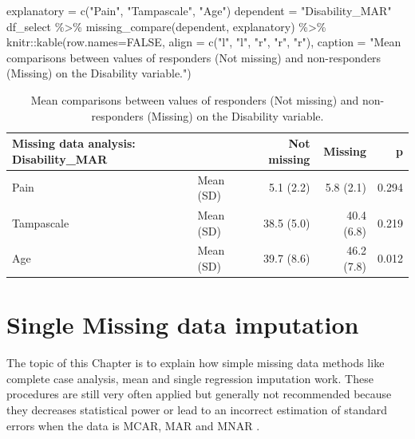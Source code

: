 \documentclass[
]{book}
\newenvironment{Shaded}{\begin{snugshade}}{\end{snugshade}}
\newcommand{\AttributeTok}[1]{\textcolor[rgb]{0.77,0.63,0.00}{#1}}
\newcommand{\ConstantTok}[1]{\textcolor[rgb]{0.00,0.00,0.00}{#1}}
\newcommand{\FunctionTok}[1]{\textcolor[rgb]{0.00,0.00,0.00}{#1}}
\newcommand{\NormalTok}[1]{#1}
\newcommand{\OtherTok}[1]{\textcolor[rgb]{0.56,0.35,0.01}{#1}}
\newcommand{\SpecialCharTok}[1]{\textcolor[rgb]{0.00,0.00,0.00}{#1}}
\newcommand{\StringTok}[1]{\textcolor[rgb]{0.31,0.60,0.02}{#1}}
\begin{document}
\begin{Shaded}
\begin{Highlighting}[]
\NormalTok{explanatory }\OtherTok{=} \FunctionTok{c}\NormalTok{(}\StringTok{"Pain"}\NormalTok{, }\StringTok{"Tampascale"}\NormalTok{, }\StringTok{"Age"}\NormalTok{)}
\NormalTok{dependent }\OtherTok{=} \StringTok{"Disability\_MAR"}
\NormalTok{df\_select }\SpecialCharTok{\%\textgreater{}\%} 
  \FunctionTok{missing\_compare}\NormalTok{(dependent, explanatory) }\SpecialCharTok{\%\textgreater{}\%} 
\NormalTok{    knitr}\SpecialCharTok{::}\FunctionTok{kable}\NormalTok{(}\AttributeTok{row.names=}\ConstantTok{FALSE}\NormalTok{, }\AttributeTok{align =} \FunctionTok{c}\NormalTok{(}\StringTok{"l"}\NormalTok{, }\StringTok{"l"}\NormalTok{, }\StringTok{"r"}\NormalTok{, }\StringTok{"r"}\NormalTok{, }\StringTok{"r"}\NormalTok{), }
        \AttributeTok{caption =} \StringTok{"Mean comparisons between values of responders (Not missing) and }
\StringTok{        non{-}responders (Missing) on the Disability variable."}\NormalTok{)}
\end{Highlighting}
\end{Shaded}

\begin{table}

\caption{\label{tab:unnamed-chunk-53}Mean comparisons between values of responders (Not missing) and 
        non-responders (Missing) on the Disability variable.}
\centering
\begin{tabular}[t]{l|l|r|r|r}
\hline
Missing data analysis: Disability\_MAR &   & Not missing & Missing & p\\
\hline
Pain & Mean (SD) & 5.1 (2.2) & 5.8 (2.1) & 0.294\\
\hline
Tampascale & Mean (SD) & 38.5 (5.0) & 40.4 (6.8) & 0.219\\
\hline
Age & Mean (SD) & 39.7 (8.6) & 46.2 (7.8) & 0.012\\
\hline
\end{tabular}
\end{table}

\hypertarget{single-missing-data-imputation}{%
\chapter{Single Missing data imputation}\label{single-missing-data-imputation}}

The topic of this Chapter is to explain how simple missing data methods like complete case analysis, mean and single regression imputation work. These procedures are still very often applied \citep{Eekhout2012} but generally not recommended because they decreases statistical power or lead to an incorrect estimation of standard errors when the data is MCAR, MAR and MNAR \citep{Eekhout2014, VanBuuren2018, enders2010applied}.
\end{document}
